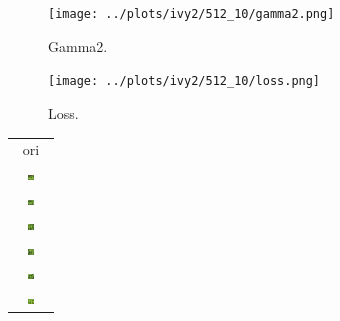 \documentclass[letter]{article}
\begin{document}
\begin{figure}[h!]
	\centering
	\texttt{[image: ../plots/ivy2/512\_10/gamma2.png]}
	\caption{\label{fig:gamma1}Gamma2.}
\end{figure}

\begin{figure}[h!]
	\centering
	\texttt{[image: ../plots/ivy2/512\_10/loss.png]}
	\caption{\label{fig:gamma1}Loss.}
\end{figure}

\newpage

\begin{table}[h!]
	\centering
	\begin{tabular}{c}
		ori\tabularnewline
		\includegraphics[width=0.17\textwidth]{../data/ivy2/512/1} \tabularnewline		\includegraphics[width=0.17\textwidth]{../data/ivy2/512/2} \tabularnewline		\includegraphics[width=0.17\textwidth]{../data/ivy2/512/3} \tabularnewline		\includegraphics[width=0.17\textwidth]{../data/ivy2/512/4} \tabularnewline		\includegraphics[width=0.17\textwidth]{../data/ivy2/512/5} \tabularnewline		\includegraphics[width=0.17\textwidth]{../data/ivy2/512/6} \tabularnewline

\end{tabular}
\end{table}
\end{document}
